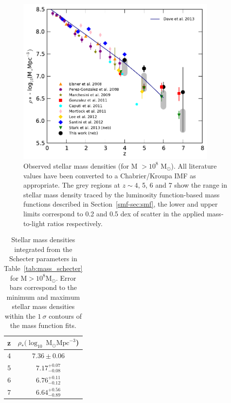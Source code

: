 \begin{figure}
\centering
\includegraphics[width=100mm]{plots/fig12.pdf}
\caption[Observed stellar mass densities (for M $>10^8$ M$_{\odot}$).]{Observed stellar mass densities (for M $>10^8$ M$_{\odot}$). All literature values have been converted to a Chabrier/Kroupa IMF as appropriate. The grey regions at $z \sim 4$, 5, 6 and 7 show the range in stellar mass density traced by the luminosity function-based mass functions described in Section~\ref{smf-sec:smf}, the lower and upper limits correspond to 0.2 and 0.5 dex of scatter in the applied mass-to-light ratios respectively.}
\label{smf-fig:smd_evolution}
\end{figure}


\begin{table}
\centering
\caption[Stellar mass densities integrated from the Schecter parameters in Table~\ref{tab:mass_schecter} for $\text{M} > 10^8 \text{M}_{\odot}$.]{Stellar mass densities integrated from the Schecter parameters in Table~\ref{tab:mass_schecter} for $\text{M} > 10^8 \text{M}_{\odot}$. Error bars correspond to the minimum and maximum stellar mass densities within the $1~\sigma$ contours of the mass function fits.}
\begin{tabular}{c c}
\hline
z & $\rho_{*} (\log_{10}~\text{M}_{\odot} \text{Mpc}^{-3}$)\\
\hline
4 & $7.36\pm0.06$ \\
5 & $7.17^{+0.07}_{-0.08}$ \\
6 & $6.76^{+0.11}_{-0.12}$ \\
7 & $6.64^{+0.56}_{-0.89}$ \\
\hline
\end{tabular}\label{tab:smd}
\end{table}

